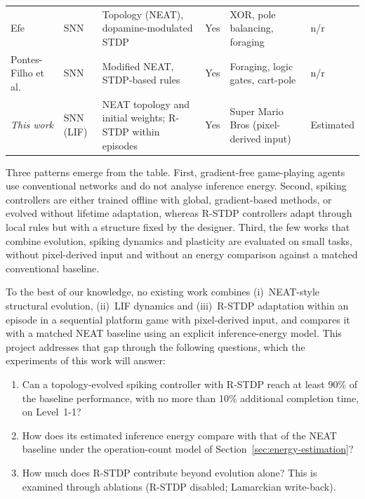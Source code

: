 \begin{table}[t]
\begin{tabularx}{\textwidth}{@{}>{\raggedright\arraybackslash}p{2.9cm}>{\raggedright\arraybackslash}p{1.5cm}Y>{\raggedright\arraybackslash}p{1.2cm}Y>{\raggedright\arraybackslash}p{1.7cm}@{}}
    Efe~\cite{efe2021} & SNN & Topology (NEAT), dopamine-modulated STDP & Yes & XOR, pole balancing, foraging & n/r \\
    Pontes-Filho et al.~\cite{pontesfilho2022} & SNN & Modified NEAT, STDP-based rules & Yes & Foraging, logic gates, cart-pole & n/r \\
    \midrule
    \textit{This work} & SNN (LIF) & NEAT topology and initial weights; R-STDP within episodes & Yes & Super Mario Bros (pixel-derived input) & Estimated \\
    \bottomrule
  \end{tabularx}
\end{table}

Three patterns emerge from the table.
First, gradient-free game-playing agents use conventional networks and do not analyse inference energy.
Second, spiking controllers are either trained offline with global, gradient-based methods, or evolved without lifetime adaptation, whereas R-STDP controllers adapt through local rules but with a structure fixed by the designer.
Third, the few works that combine evolution, spiking dynamics and plasticity are evaluated on small tasks, without pixel-derived input and without an energy comparison against a matched conventional baseline.

To the best of our knowledge, no existing work combines (i)~NEAT-style structural evolution, (ii)~LIF dynamics and (iii)~R-STDP adaptation within an episode in a sequential platform game with pixel-derived input, and compares it with a matched NEAT baseline using an explicit inference-energy model.
This project addresses that gap through the following questions, which the experiments of this work will answer:
\begin{enumerate}
  \item Can a topology-evolved spiking controller with R-STDP reach at least 90\% of the baseline performance, with no more than 10\% additional completion time, on Level~1-1?
  \item How does its estimated inference energy compare with that of the NEAT baseline under the operation-count model of Section~\ref{sec:energy-estimation}?
  \item How much does R-STDP contribute beyond evolution alone? This is examined through ablations (R-STDP disabled; Lamarckian write-back).
\end{enumerate}